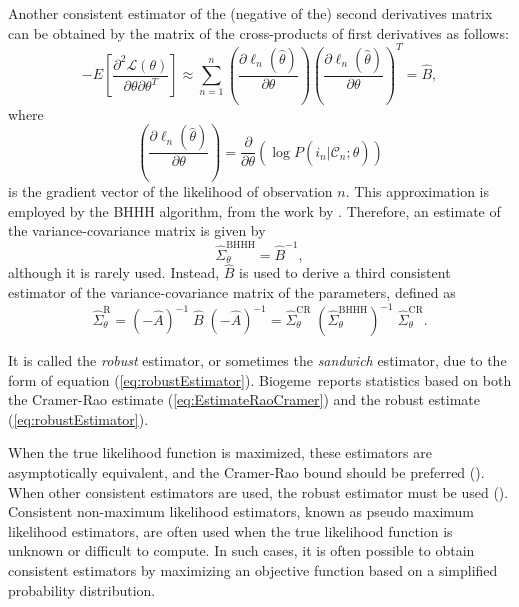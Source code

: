 \documentclass[12pt,a4paper]{article}
\newcommand{\req}[1]{(\ref{#1})}
\newcommand{\C}{\mathcal{C}}
\renewcommand{\L}{\mathcal{L}}
\newcommand{\BIOGEME}{Biogeme}
\begin{document}
Another consistent estimator of the (negative of the) second
derivatives matrix can be obtained by the matrix of the cross-products of first derivatives as follows:
\begin{equation}
\label{eq:binaryBHHH}
-E\left[ \frac{\partial^2 \L(\theta)}{\partial \theta \partial \theta^T}\right] \approx  \sum_{n=1}^n \left(\frac{\partial \ell_n(\hat{\theta})}{\partial \theta} \right)\left(\frac{\partial \ell_n(\hat{\theta})}{\partial \theta} \right)^T = \hat{B},
\end{equation}
 where
\begin{equation}
\left(\frac{\partial \ell_n(\hat{\theta})}{\partial \theta} \right) = \frac{\partial}{\partial \theta} (\log P(i_n|\C_n;\widehat{\theta}))
\end{equation}
is the gradient vector of the likelihood of observation $n$.
This approximation is employed by the BHHH algorithm, from the work by . Therefore, an estimate of the variance-covariance matrix 
is given by 
\begin{equation}
\widehat{\Sigma}^{\text{BHHH}}_{\theta} =\hat{B}^{-1},
\end{equation}
 although it is rarely used. 
Instead, $\hat{B}$ is
used to derive  a third consistent estimator of the variance-covariance matrix of
the parameters, defined as
\begin{equation}
\label{eq:robustEstimator}
\widehat{\Sigma}^{\text{R}}_{\theta} = (-\hat{A})^{-1} \; \widehat{B}\; (-\hat{A})^{-1} = \widehat{\Sigma}^{\text{CR}}_{\theta} \; (\widehat{\Sigma}^{\text{BHHH}}_{\theta})^{-1} \; \widehat{\Sigma}^{\text{CR}}_{\theta}.
\end{equation}

It is
called the \emph{robust} estimator, or sometimes the \emph{sandwich}
estimator, due to the form of equation
\req{eq:robustEstimator}. \BIOGEME\ reports statistics based on  both the Cramer-Rao estimate
\req{eq:EstimateRaoCramer} and the robust estimate \req{eq:robustEstimator}.


 When the true likelihood function is maximized,  these estimators are
 asymptotically equivalent, and the Cramer-Rao bound should be
preferred (\cite{KaueCarr2001}).  When other consistent estimators are
used, the robust estimator must be used
(\cite{Whit82}). Consistent non-maximum likelihood estimators, known
as pseudo maximum likelihood estimators, are often used when the true
likelihood function is unknown or difficult to compute. In such cases,
it is often possible to obtain consistent estimators by maximizing an
objective function based on a simplified probability distribution. 
\end{document}

